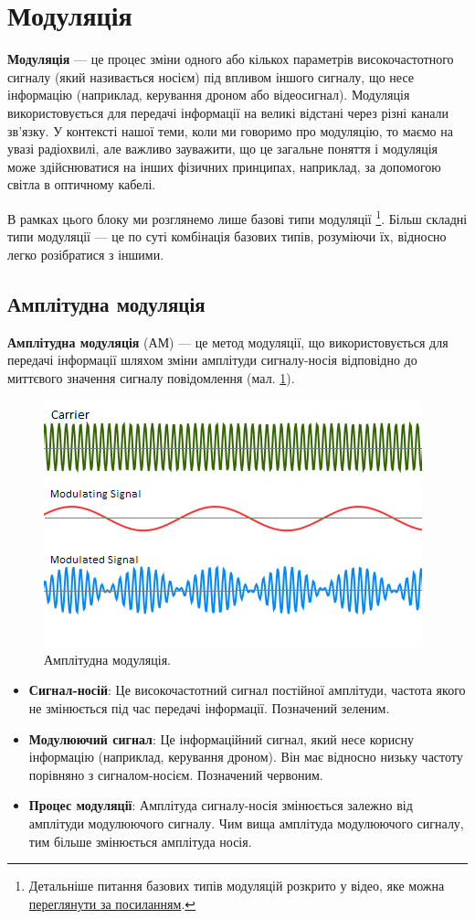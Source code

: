 \documentclass{article}
\begin{document}
\section{Модуляція}
\label{sec:modulation}

\textbf{Модуляція} --- це процес зміни одного або кількох параметрів високочастотного сигналу (який називається носієм) під впливом іншого сигналу, що несе інформацію (наприклад, керування дроном або відеосигнал). Модуляція використовується для передачі інформації на великі відстані через різні канали зв'язку. У контексті нашої теми, коли ми говоримо про модуляцію, то маємо на увазі радіохвилі, але важливо зауважити, що це загальне поняття і модуляція може здійснюватися на інших фізичних принципах, наприклад, за допомогою світла в оптичному кабелі.

В рамках цього блоку ми розглянемо лише базові типи модуляції \footnote{Детальніше питання базових типів модуляцій розкрито у відео, яке можна \href{https://www.youtube.com/watch?v=gfz1FbIOMbs}{переглянути за посиланням}.}. Більш складні типи модуляції --- це по суті комбінація базових типів, розуміючи їх, відносно легко розібратися з іншими.

\subsection{Амплітудна модуляція}
\textbf{Амплітудна модуляція} (АМ) --- це метод модуляції, що використовується для передачі інформації шляхом зміни амплітуди сигналу-носія відповідно до миттєвого значення сигналу повідомлення (мал. \ref{fig:am}).

\begin{figure}[h!]
\centering
\includegraphics[width=0.6\linewidth]{images/am.png}
\caption{\label{fig:am}Амплітудна модуляція.}
\end{figure}

\begin{itemize}[noitemsep, topsep=8pt]
\item \textbf{Сигнал-носій}: Це високочастотний сигнал постійної амплітуди, частота якого не змінюється під час передачі інформації. Позначений зеленим.
\item \textbf{Модулюючий сигнал}: Це інформаційний сигнал, який несе корисну інформацію (наприклад, керування дроном). Він має відносно низьку частоту порівняно з сигналом-носієм. Позначений червоним.
\item \textbf{Процес модуляції}: Амплітуда сигналу-носія змінюється залежно від амплітуди модулюючого сигналу. Чим вища амплітуда модулюючого сигналу, тим більше змінюється амплітуда носія.
\end{itemize}
\end{document}
